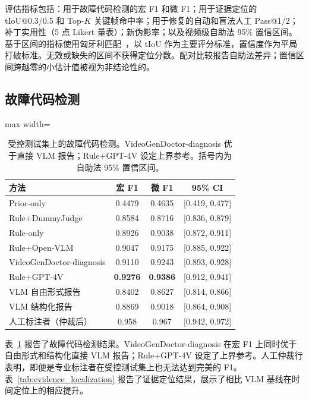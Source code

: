 \documentclass{article}
\newcommand{\HumanDiagMacroF}{0.958}
\newcommand{\HumanDiagMicroF}{0.967}
\begin{document}
评估指标包括：用于故障代码检测的宏 F1 和微 F1；用于证据定位的 tIoU@0.3/0.5 和 Top-$K$ 关键帧命中率；用于修复的自动和盲法人工 Pass@1/2；补丁实用性（5 点 Likert 量表）；新伪影率；以及视频级自助法 95\% 置信区间。基于区间的指标使用匈牙利匹配~\cite{kuhn1955hungarian}，以 tIoU 作为主要评分标准，置信度作为平局打破标准。无效或缺失的区间不获得定位分数。配对比较报告自助法差异；置信区间跨越零的小估计值被视为非结论性的。

\subsection{故障代码检测}
\label{sec:f1_results}
\begin{table}[t]
\centering\small
\caption{受控测试集上的故障代码检测。VideoGenDoctor-diagnosis 优于直接 VLM 报告；Rule+GPT-4V 设定上界参考。括号内为自助法 95\% 置信区间。}
\label{tab:code_detection}
\begin{adjustbox}{max width=\textwidth}
\begin{tabular}{lccc}
\toprule
\textbf{方法} & \textbf{宏 F1} & \textbf{微 F1} & \textbf{95\% CI} \\
\midrule
Prior-only & 0.4479 & 0.4635 & [0.419, 0.477] \\
Rule+DummyJudge & 0.8584 & 0.8716 & [0.836, 0.879] \\
Rule-only & 0.8926 & 0.9038 & [0.872, 0.911] \\
Rule+Open-VLM & 0.9047 & 0.9175 & [0.885, 0.922] \\
VideoGenDoctor-diagnosis & 0.9110 & 0.9243 & [0.893, 0.928] \\
Rule+GPT-4V & \textbf{0.9276} & \textbf{0.9386} & [0.912, 0.941] \\
VLM 自由形式报告 & 0.8402 & 0.8627 & [0.814, 0.866] \\
VLM 结构化报告 & 0.8869 & 0.9018 & [0.864, 0.908] \\
\midrule
人工标注者（仲裁后） & \HumanDiagMacroF & \HumanDiagMicroF & [0.942, 0.972] \\
\bottomrule
\end{tabular}
\end{adjustbox}
\end{table}

表~\ref{tab:code_detection} 报告了故障代码检测结果。VideoGenDoctor-diagnosis 在宏 F1 上同时优于自由形式和结构化直接 VLM 报告；Rule+GPT-4V 设定了上界参考。人工仲裁行表明，即便是专业标注者在受控测试集上也无法达到完美的 F1。表~\ref{tab:evidence_localization} 报告了证据定位结果，展示了相比 VLM 基线在时间定位上的相应提升。
\end{document}
